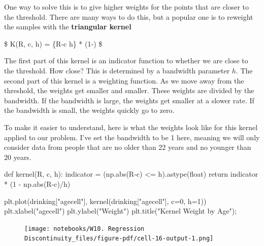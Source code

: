 \documentclass[
  letterpaper,
  DIV=11,
  numbers=noendperiod]{scrreprt}
\newenvironment{Shaded}{\begin{snugshade}}{\end{snugshade}}
\newcommand{\BuiltInTok}[1]{\textcolor[rgb]{0.00,0.23,0.31}{#1}}
\newcommand{\ControlFlowTok}[1]{\textcolor[rgb]{0.00,0.23,0.31}{#1}}
\newcommand{\DecValTok}[1]{\textcolor[rgb]{0.68,0.00,0.00}{#1}}
\newcommand{\KeywordTok}[1]{\textcolor[rgb]{0.00,0.23,0.31}{#1}}
\newcommand{\NormalTok}[1]{\textcolor[rgb]{0.00,0.23,0.31}{#1}}
\newcommand{\OperatorTok}[1]{\textcolor[rgb]{0.37,0.37,0.37}{#1}}
\newcommand{\StringTok}[1]{\textcolor[rgb]{0.13,0.47,0.30}{#1}}
\begin{document}
One way to solve this is to give higher weights for the points that are
closer to the threshold. There are many ways to do this, but a popular
one is to reweight the samples with the \textbf{triangular kernel}

\$ K(R, c, h) = \{\textbar R-c\textbar{} \leq h\} *
\bigg(1-\bigg) \$

The first part of this kernel is an indicator function to whether we are
close to the threshold. How close? This is determined by a bandwidth
parameter \(h\). The second part of this kernel is a weighting function.
As we move away from the threshold, the weights get smaller and smaller.
These weights are divided by the bandwidth. If the bandwidth is large,
the weights get smaller at a slower rate. If the bandwidth is small, the
weights quickly go to zero.

To make it easier to understand, here is what the weights look like for
this kernel applied to our problem. I've set the bandwidth to be 1 here,
meaning we will only consider data from people that are no older than 22
years and no younger than 20 years.

\begin{Shaded}
\begin{Highlighting}[]
\KeywordTok{def}\NormalTok{ kernel(R, c, h):}
\NormalTok{    indicator }\OperatorTok{=}\NormalTok{ (np.}\BuiltInTok{abs}\NormalTok{(R}\OperatorTok{{-}}\NormalTok{c) }\OperatorTok{\textless{}=}\NormalTok{ h).astype(}\BuiltInTok{float}\NormalTok{)}
    \ControlFlowTok{return}\NormalTok{ indicator }\OperatorTok{*}\NormalTok{ (}\DecValTok{1} \OperatorTok{{-}}\NormalTok{ np.}\BuiltInTok{abs}\NormalTok{(R}\OperatorTok{{-}}\NormalTok{c)}\OperatorTok{/}\NormalTok{h)}
\end{Highlighting}
\end{Shaded}

\begin{Shaded}
\begin{Highlighting}[]
\NormalTok{plt.plot(drinking[}\StringTok{"agecell"}\NormalTok{], kernel(drinking[}\StringTok{"agecell"}\NormalTok{], c}\OperatorTok{=}\DecValTok{0}\NormalTok{, h}\OperatorTok{=}\DecValTok{1}\NormalTok{))}
\NormalTok{plt.xlabel(}\StringTok{"agecell"}\NormalTok{)}
\NormalTok{plt.ylabel(}\StringTok{"Weight"}\NormalTok{)}
\NormalTok{plt.title(}\StringTok{"Kernel Weight by Age"}\NormalTok{)}\OperatorTok{;}
\end{Highlighting}
\end{Shaded}

\begin{figure}[H]

{\centering \texttt{[image: notebooks/W10. Regression Discontinuity\_files/figure-pdf/cell-16-output-1.png]}

}

\end{figure}
\end{document}
